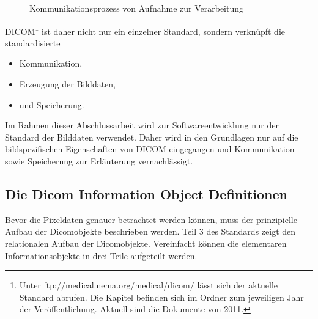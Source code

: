 \begin{figure}[htbp]
  \vspace{0.5cm}
  \centering
  \caption{Kommunikationsprozess von Aufnahme zur Verarbeitung}
  \label{communication}
  \vspace{0.5cm}
\end{figure}

DICOM\footnote{Unter ftp://medical.nema.org/medical/dicom/ lässt sich der aktuelle Standard abrufen. Die Kapitel befinden sich im Ordner zum jeweiligen Jahr der Veröffentlichung. Aktuell sind die Dokumente von 2011.} ist daher nicht nur ein einzelner Standard, sondern verknüpft die standardisierte 
\begin{itemize}
\item Kommunikation,
\item Erzeugung der Bilddaten,
\item und Speicherung.
\end{itemize}
Im Rahmen dieser Abschlussarbeit wird zur Softwareentwicklung nur der Standard der Bilddaten verwendet. Daher wird in den Grundlagen nur auf die bildspezifischen Eigenschaften von DICOM eingegangen und Kommunikation sowie Speicherung zur Erläuterung vernachlässigt.

\subsection{Die Dicom Information Object Definitionen} \label{grundlagen:iod}
Bevor die Pixeldaten genauer betrachtet werden können, muss der prinzipielle Aufbau der Dicomobjekte beschrieben werden. Teil 3 des Standards\cite[A.1.2]{dicom:iod} zeigt den relationalen Aufbau der Dicomobjekte. Vereinfacht können die elementaren Informationsobjekte in drei Teile aufgeteilt werden.

